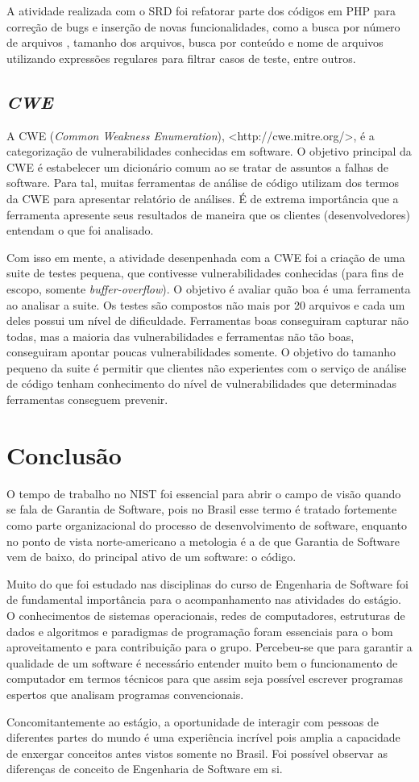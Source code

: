 A atividade realizada com o SRD foi refatorar parte dos códigos em PHP para correção de bugs e inserção de novas funcionalidades, como a busca por número de arquivos , tamanho dos arquivos, busca por conteúdo e nome de arquivos utilizando expressões regulares para filtrar casos de teste, entre outros.

\section{\textit{CWE}}
A CWE (\textit{Common Weakness Enumeration}), <http://cwe.mitre.org/>, é a categorização de vulnerabilidades conhecidas em software. O objetivo principal da CWE é estabelecer um dicionário comum ao se tratar de assuntos a falhas de software. Para tal, muitas ferramentas de análise de código utilizam dos termos da CWE para apresentar relatório de análises. É de extrema importância que a ferramenta apresente seus resultados de maneira que os clientes (desenvolvedores) entendam o que foi analisado.

Com isso em mente, a atividade desenpenhada com a CWE foi a criação de uma suite de testes pequena, que contivesse vulnerabilidades conhecidas (para fins de escopo, somente \textit{buffer-overflow}). O objetivo é avaliar quão boa é uma ferramenta ao analisar a suite. Os testes são compostos não mais por 20 arquivos e cada um deles possui um nível de dificuldade. Ferramentas boas conseguiram capturar não todas, mas a maioria das vulnerabilidades e ferramentas não tão boas, conseguiram apontar poucas vulnerabilidades somente. O objetivo do tamanho pequeno da suite é permitir que clientes não experientes com o serviço de análise de código tenham conhecimento do nível de vulnerabilidades que determinadas ferramentas conseguem prevenir.


\chapter{Conclusão}
O tempo de trabalho no NIST foi essencial para abrir o campo de visão quando se fala de Garantia de Software, pois no Brasil esse termo é tratado fortemente como parte organizacional do processo de desenvolvimento de software, enquanto no ponto de vista norte-americano a metologia é a de que Garantia de Software vem de baixo, do principal ativo de um software: o código.

Muito do que foi estudado nas disciplinas do curso de Engenharia de Software foi de fundamental importância para o acompanhamento nas atividades do estágio. O conhecimentos de sistemas operacionais, redes de computadores, estruturas de dados e algoritmos e paradigmas de programação foram essenciais para o bom aproveitamento e para contribuição para o grupo. Percebeu-se que para garantir a qualidade de um software é necessário entender muito bem o funcionamento de computador em termos técnicos para que assim seja possível escrever programas espertos que analisam programas convencionais.

Concomitantemente ao estágio, a oportunidade de interagir com pessoas de diferentes partes do mundo é uma experiência incrível pois amplia a capacidade de enxergar conceitos antes vistos somente no Brasil. Foi possível observar as diferenças de conceito de Engenharia de Software em si.
